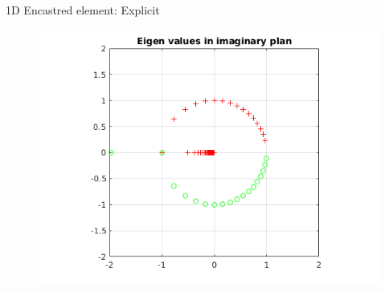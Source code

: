 \begin{frame}{1D Encastred element: Explicit}
\begin{figure}[ht] 
  \label{ fig7} 
  \begin{minipage}[b]{0.5\linewidth}
    \centering
    \includegraphics[scale=.35]{images/enc-exp-1.png} \\


\end{minipage}
\end{figure}
\end{frame}
